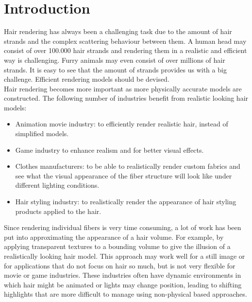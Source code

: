 \documentclass[11pt,a4paper]{report}
\begin{document}

%
%
\tableofcontents

\chapter{Introduction}


Hair rendering has always been a challenging task due to the amount of hair strands and the complex scattering behaviour between them. A human head may consist of over 100.000 hair strands and rendering them in a realistic and efficient way is challenging. Furry animals may even consist of over millions of hair strands. It is easy to see that the amount of strands provides us with a big challenge. Efficient rendering models should be devised.\\

Hair rendering becomes more important as more physically accurate models are constructed. The following number of industries benefit from realistic looking hair models:

\begin{itemize}
\item Animation movie industry: to efficiently render realistic hair, instead of simplified models.
\item Game industry to enhance realism and for better visual effects.
\item Clothes manufacturers: to be able to realistically render custom fabrics and see what the visual appearance of the fiber structure will look like under different lighting conditions.
\item Hair styling industry: to realistically render the appearance of hair styling products applied to the hair.
\end{itemize}

Since rendering individual fibers is very time consuming, a lot of work has been put into approximating the appearance of a hair volume. For example, by applying transparent textures to a bounding volume to give the illusion of a realistically looking hair model. This approach may work well for a still image or for applications that do not focus on hair so much, but is not very flexible for movie or game industries. These industries often have dynamic environments in which hair might be animated or lights may change position, leading to shifting highlights that are more difficult to manage using non-physical based approaches.
\end{document}
